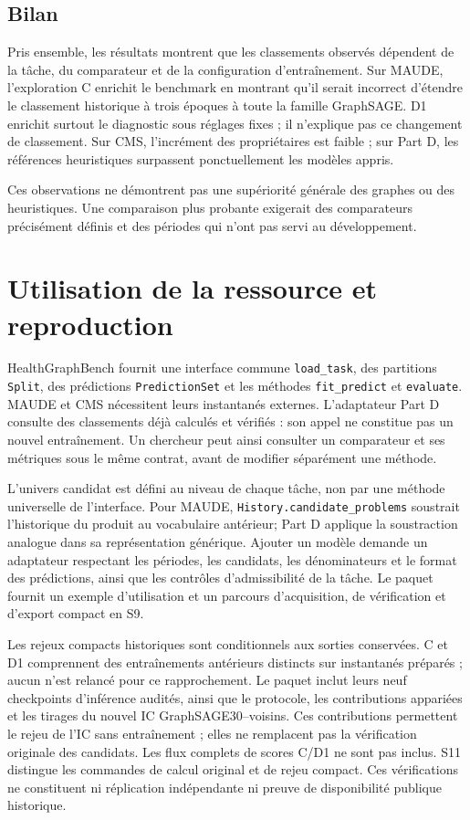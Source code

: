 \subsection{Bilan}

Pris ensemble, les résultats montrent que les classements observés dépendent de la tâche, du comparateur et de la configuration d'entraînement. Sur MAUDE, l'exploration C enrichit le benchmark en montrant qu'il serait incorrect d'étendre le classement historique à trois époques à toute la famille GraphSAGE. D1 enrichit surtout le diagnostic sous réglages fixes ; il n'explique pas ce changement de classement. Sur CMS, l'incrément des propriétaires est faible ; sur Part D, les références heuristiques surpassent ponctuellement les modèles appris.

Ces observations ne démontrent pas une supériorité générale des graphes ou des heuristiques. Une comparaison plus probante exigerait des comparateurs précisément définis et des périodes qui n'ont pas servi au développement.


\section{Utilisation de la ressource et reproduction}
\label{sec:repro}
HealthGraphBench fournit une interface commune \texttt{load\_task}, des partitions \texttt{Split}, des prédictions \texttt{PredictionSet} et les méthodes \texttt{fit\_predict} et \texttt{evaluate}\cite{hgbinterface}. MAUDE et CMS nécessitent leurs instantanés externes. L'adaptateur Part D consulte des classements déjà calculés et vérifiés : son appel ne constitue pas un nouvel entraînement. Un chercheur peut ainsi consulter un comparateur et ses métriques sous le même contrat, avant de modifier séparément une méthode.

L'univers candidat est défini au niveau de chaque tâche, non par une méthode universelle de l'interface. Pour MAUDE, \texttt{History.candidate\_problems} soustrait l'historique du produit au vocabulaire antérieur; Part D applique la soustraction analogue dans sa représentation générique. Ajouter un modèle demande un adaptateur respectant les périodes, les candidats, les dénominateurs et le format des prédictions, ainsi que les contrôles d'admissibilité de la tâche. Le paquet fournit un exemple d'utilisation et un parcours d'acquisition, de vérification et d'export compact en S9.

Les rejeux compacts historiques sont conditionnels aux sorties conservées. C et D1 comprennent des entraînements antérieurs distincts sur instantanés préparés ; aucun n'est relancé pour ce rapprochement. Le paquet inclut leurs neuf checkpoints d'inférence audités, ainsi que le protocole, les contributions appariées et les tirages du nouvel IC GraphSAGE30--voisins. Ces contributions permettent le rejeu de l'IC sans entraînement ; elles ne remplacent pas la vérification originale des candidats. Les flux complets de scores C/D1 ne sont pas inclus. S11 distingue les commandes de calcul original et de rejeu compact. Ces vérifications ne constituent ni réplication indépendante ni preuve de disponibilité publique historique.

